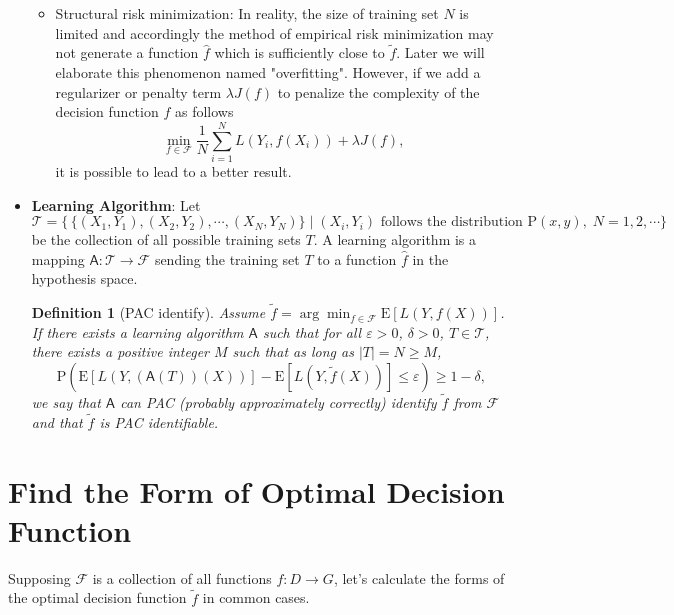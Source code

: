 \documentclass{report}
\newtheorem{definition}{Definition}[chapter]
\theoremstyle{nonumberplain}
\newcommand{\0}{\mathbf{0}}
\begin{document}
\begin{itemize}
\begin{itemize}
		\item Structural risk minimization: In reality, the size of training set $N$ is limited and accordingly the method of empirical risk minimization may not generate a function $\hat{f}$ which is sufficiently close to $\tilde{f}$. Later we will elaborate this phenomenon named "overfitting". However, if we add a regularizer or penalty term $\lambda J(f)$ to penalize the complexity of the decision function $f$ as follows
		\[
		\min_{f\in\mathcal{F}}\frac{1}{N}\sum_{i=1}^{N}L(Y_i,f(X_i))+\lambda J(f),
		\]
		it is possible to lead to a better result.
	\end{itemize} 
	\item \textbf{Learning Algorithm}: Let $$\mathscr{T}=\{\,\{(X_1,Y_1),(X_2,Y_2),\cdots,(X_{N},Y_{N})\}\;|\;(X_i,Y_i) \text{ follows the distribution }\mathrm{P}(x,y),\;N=1,2,\cdots \}$$ 
	be the collection of all possible training sets $T$. A learning algorithm is a mapping $\mathsf{A}:\mathscr{T}\to\mathcal{F}$ sending the training set $T$ to a function $\hat{f}$ in the hypothesis space. 
	

	\begin{definition}[PAC identify]
		Assume $\tilde{f}=\arg\min_{f\in\mathcal{F}}\mathrm{E}[L(Y,f(X))]
		$. If there exists a learning algorithm $\mathsf{A}$ such that for all $\varepsilon>0$, $\delta>0$, $T\in \mathcal{T}$, there exists a positive integer $M$ such that as long as $|T|=N\ge M$,
		\[
		\mathrm{P}\left(\mathrm{E}[L(Y,(\mathsf{A}(T))(X))]-\mathrm{E}[L(Y,\tilde{f}(X))] \le \varepsilon\right) \ge 1-\delta,
		\]
		we say that $\mathsf{A}$ can PAC (probably approximately correctly) identify $\tilde{f}$ from $\mathcal{F}$ and that $\tilde{f}$ is PAC identifiable.
	\end{definition}
\end{itemize} 




		
	
\section{Find the Form of Optimal Decision Function }
Supposing $\mathcal{F}$ is a collection of all functions $f:D\to G$, let's calculate the forms of the optimal decision function $\tilde{f}$ in common cases.
\end{document}
